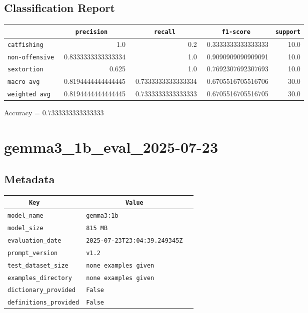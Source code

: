 \documentclass{article}
\begin{document}
\subsection{Classification Report}

\begin{center}
\begin{tabular}{l | r | r | r | r} \hline
    \verb|            | & \verb|    precision     | & \verb|      recall      | & \verb|     f1-score     | & \verb|support| \\ \hline
    \hline
    \verb|catfishing | & 1.0 & 0.2 & 0.3333333333333333 &    10.0 \\ \hline
    \verb|non-offensive| & 0.8333333333333334 & 1.0 & 0.9090909090909091 &    10.0 \\ \hline
    \verb|sextortion | & 0.625 & 1.0 & 0.7692307692307693 &    10.0 \\ \hline
    \verb|macro avg  | & 0.8194444444444445 & 0.7333333333333334 & 0.6705516705516706 &    30.0 \\ \hline
    \verb|weighted avg| & 0.8194444444444445 & 0.7333333333333333 & 0.6705516705516705 &    30.0 \\ \hline
\end{tabular}
\end{center}

\begin{center}
Accuracy = 0.7333333333333333
\end{center}

\section{gemma3\_1b\_eval\_2025-07-23}
\subsection{Metadata}

\begin{center}
\begin{tabular}{l | l} \hline
    \verb|      Key      | & \verb|           Value           | \\ \hline
    \hline
    \verb|model_name    | & \verb|gemma3:1b                    | \\ \hline
    \verb|model_size    | & \verb|815 MB                       | \\ \hline
    \verb|evaluation_date| & \verb|2025-07-23T23:04:39.249345Z  | \\ \hline
    \verb|prompt_version| & \verb|v1.2                         | \\ \hline
    \verb|test_dataset_size| & \verb|none examples given          | \\ \hline
    \verb|examples_directory| & \verb|none examples given          | \\ \hline
    \verb|dictionary_provided| & \verb|False                        | \\ \hline
    \verb|definitions_provided| & \verb|False                        | \\ \hline
\end{tabular}
\end{center}
\end{document}
